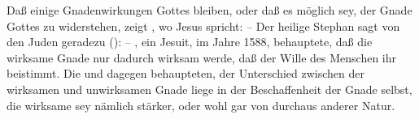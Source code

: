 \begin{aufza}
\item Daß einige Gnadenwirkungen Gottes  bleiben, oder daß es möglich sey, der Gnade Gottes zu widerstehen, zeigt , wo Jesus spricht:  -- Der heilige Stephan sagt von den Juden geradezu ():  -- , ein Jesuit, im Jahre 1588, behauptete, daß die wirksame Gnade nur dadurch wirksam werde, daß der Wille des Menschen ihr beistimmt. Die  und  dagegen behaupteten, der Unterschied zwischen der wirksamen und unwirksamen Gnade liege in der Beschaffenheit der Gnade selbst, die wirksame sey nämlich stärker, oder wohl gar von durchaus anderer Natur.
\end{aufza}

